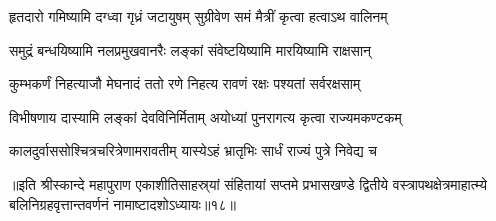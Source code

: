 \twolineshloka
{हृतदारो गमिष्यामि दग्ध्वा गृध्रं जटायुषम्}
{सुग्रीवेण समं मैत्रीं कृत्वा हत्वाऽथ वालिनम्}%

\twolineshloka
{समुद्रं बन्धयिष्यामि नलप्रमुखवानरैः}
{लङ्कां संवेष्टयिष्यामि मारयिष्यामि राक्षसान्}%

\twolineshloka
{कुम्भकर्णं निहत्याजौ मेघनादं ततो रणे}
{निहत्य रावणं रक्षः पश्यतां सर्वरक्षसाम्}%

\twolineshloka
{विभीषणाय दास्यामि लङ्कां देवविनिर्मिताम्}
{अयोध्यां पुनरागत्य कृत्वा राज्यमकण्टकम्}%

\twolineshloka
{कालदुर्वाससोश्चित्रचरित्रेणामरावतीम्}
{यास्येऽहं भ्रातृभिः सार्धं राज्यं पुत्रे निवेद्य च}%

॥इति श्रीस्कान्दे महापुराण एकाशीतिसाहस्र्यां संहितायां सप्तमे प्रभासखण्डे द्वितीये वस्त्रापथक्षेत्रमाहात्म्ये बलिनिग्रहवृत्तान्तवर्णनं नामाष्टादशोऽध्यायः॥१८॥
